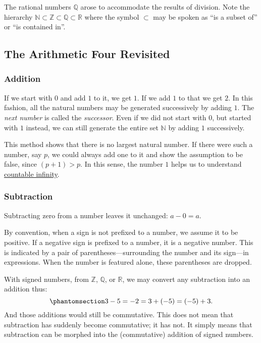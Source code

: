 \documentclass[
  a4paper,
]{article}
\begin{document}
The rational numbers \(\mathbb{Q}\) arose to accommodate the results of
division. Note the hierarchy
\(\mathbb{N} \subset \mathbb{Z} \subset \mathbb{Q} \subset \mathbb{R}\)
where the symbol \(\subset\) may be spoken as ``is a subset of'' or ``is
contained in''.

\subsection{The Arithmetic Four
Revisited}\label{the-arithmetic-four-revisited}

\subsubsection{Addition}\label{addition}

If we start with \(0\) and add \(1\) to it, we get \(1\). If we add
\(1\) to that we get \(2\). In this fashion, all the natural numbers may
be generated successively by adding \(1\). The \emph{next number} is
called the \emph{successor}. Even if we did not start with \(0\), but
started with \(1\) instead, we can still generate the entire set
\(\mathbb{N}\) by adding \(1\) successively.

This method shows that there is no largest natural number. If there were
such a number, say \(p\), we could always add one to it and show the
assumption to be false, since \((p + 1) > p\). In this sense, the number
\(1\) helps us to understand
\href{https://mathinsight.org/definition/countably_infinite}{countable
infinity}.

\subsubsection{Subtraction}\label{subtraction}

Subtracting zero from a number leaves it unchanged: \(a - 0 = a\).

By convention, when a sign is not prefixed to a number, we assume it to
be positive. If a negative sign is prefixed to a number, it is a
negative number. This is indicated by a pair of
parentheses---surrounding the number and its sign---in expressions. When
the number is featured alone, these parentheses are dropped.

With signed numbers, from \(\mathbb{Z}\), \(\mathbb{Q}\), or
\(\mathbb{R}\), we may convert any subtraction into an addition thus:
\begin{equation}\phantomsection\label{eq:negnum}{
3 - 5 = -2 = 3 + (-5) = (-5) + 3.
}\end{equation} And those additions would still be commutative. This
does not mean that subtraction has suddenly become commutative; it has
not. It simply means that subtraction can be morphed into the
(commutative) addition of signed numbers.
\end{document}
